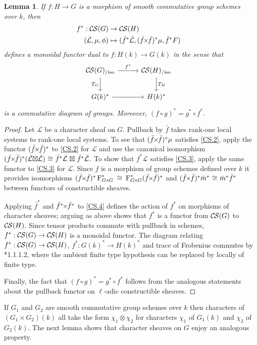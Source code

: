 \documentclass[10pt]{amsart}
\theoremstyle{plain}
\newtheorem{lemma}[theorem]{Lemma}
\theoremstyle{definition}
\theoremstyle{remark}
\newcommand{\Fq}{k}
\newcommand{\Frob}[1]{\operatorname{F}_{#1}}
\newcommand{\iso}{{\ \cong\ }}
\newcommand{\TrFrob}[1]{T_{#1}}
\newcommand{\cs}[1]{{\mathcal{#1}}}
\newcommand{\gcs}[1]{{\mathcal{\bar #1}}}
\newcommand{\CS}{{\mathcal{C\hskip-0.8pt S}}}
\newcommand{\CSiso}[1]{\CS(#1)_{/\text{iso}}}
\renewcommand{\bf}{\bar{f}}
\newcommand{\bm}{\bar{m}}
\newcommand{\tight}[3]{\hspace{-#1pt}{#2}\hspace{-#3pt}}
\newcommand{\bfxf}{\text{$\bar{f} \tight{1}{\times}{1} \bar{f}$}}
\newcommand{\GxxG}{\text{$G \tight{1}{\times}{1} G$}}
\newcommand{\LxL}{\text{$\gcs{L} \tight{0}{\boxtimes}{0} \gcs{L}$}}
\begin{document}
\begin{lemma}\label{lem:pullback}
  If $f : H\to G$ is a morphism of smooth commutative group schemes over $\Fq$, then
  \begin{align*}
  f^* : \CS(G) &\to \CS(H) \\
  (\gcs{L},\mu,\phi) &\mapsto (\bf^*\gcs{L},(\bfxf)^*\mu,\bf^*F)
  \end{align*}
  defines a monoidal functor dual to $f \colon H(\Fq) \to G(\Fq)$ in the sense that
  \[
  \begin{tikzcd}[row sep=20, column sep=30]
   \CSiso{G} \rar{f^*} \arrow[swap]{d}{\TrFrob{G}} & \CSiso{H} \dar{\TrFrob{H}} \\
   G(\Fq)^* \rar & H(\Fq)^*
  \end{tikzcd}
  \]
  is a commutative diagram of groups.  Moreover, $(f\circ g)^* = g^* \circ f^*$.
\end{lemma}
\begin{proof}
  Let $\cs{L}$ be a character sheaf on $G$. 
  Pullback by $\bf$ takes rank-one local systems to rank-one local systems.
  To see that $(\bfxf)^* \mu$ satisfies \ref{CS.2},
  apply the functor $(\bfxf)^*$
  to \ref{CS.2} for $\cs{L}$ and use the canonical isomorphism
  $(\bfxf)^*(\LxL) \iso \bf^*\gcs{L} \tight{-3}{\boxtimes}{-3} \bf^*\gcs{L}$.
  To show that $f^*\cs{L}$ satisfies
  \ref{CS.3}, apply the same functor to \ref{CS.3} for $\cs{L}$.
  Since $f$ is a morphism of group schemes defined over $\Fq$
  it provides isomorphisms $(\bfxf)^*\Frob{\GxxG}^* \iso \Frob{\GxxG}^* (\bfxf)^*$
  and $(\bfxf)^* \bm^*\iso \bm^* \bf^*$ between functors of constructible sheaves.

  Applying $\bf^*$ and $\bf^* \tight{1}{\times}{1}\bf^*$ to \ref{CS.4} defines the action
  of $f^*$ on morphisms of character sheaves; arguing as above shows that $f^*$ is
  a functor from $\CS(G)$ to $\CS(H)$.  Since tensor products commute with pullback in schemes,
  $f^* : \CS(G) \to \CS(H)$ is a monoidal functor.
  The diagram relating $f^* : \CS(G) \to \CS(H)$, $f^* : G(k)^* \to H(k)^*$ and trace of Frobenius
  commutes by \cite{laumon:87a}*{1.1.1.2}, where the ambient
 finite type hypothesis can be replaced by locally of finite type.

  Finally, the fact that $(f\circ g)^* = g^* \circ f^*$ follows from the analogous
  statements about the pullback functor on $\ell$-adic constructible sheaves.
\end{proof}

If $G_1$ and $G_2$ are smooth commutative group schemes over $\Fq$ then characters of $(G_1 \times G_2)(\Fq)$ all take the form $\chi_1\otimes \chi_2$ for characters $\chi_1$ of $G_1(\Fq)$ and $\chi_2$ of $G_2(\Fq)$. 
The next lemma shows that character sheaves on $G$ enjoy an analogous property.
\end{document}
